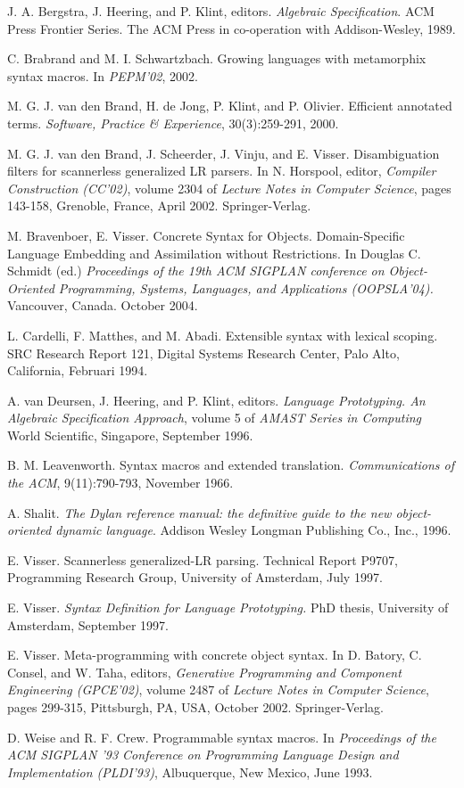 \documentclass[a4paper,11pt]{article}
\begin{document}
\begin{thebibliography}{99}

J. A. Bergstra, J. Heering, and P. Klint, editors. \emph{Algebraic
Specification}. ACM Press Frontier Series. The ACM Press in co-operation with Addison-Wesley,
1989.

C. Brabrand and M. I. Schwartzbach. Growing languages with metamorphix
syntax macros. In \emph{PEPM'02}, 2002.

M. G. J. van den Brand, H. de Jong, P. Klint, and P. Olivier. Efficient
annotated terms. \emph{Software, Practice \& Experience}, 30(3):259-291, 2000.

M. G. J. van den Brand, J. Scheerder, J. Vinju, and E. Visser.
Disambiguation filters for scannerless generalized LR parsers. In N. Horspool, editor,
\emph{Compiler Construction (CC'02)}, volume 2304 of \emph{Lecture Notes in Computer
Science}, pages 143-158, Grenoble, France, April 2002. Springer-Verlag.

M. Bravenboer, E. Visser. Concrete Syntax for Objects.
Domain-Specific Language Embedding and Assimilation without Restrictions. In Douglas
C. Schmidt (ed.) \emph{Proceedings of the 19th ACM SIGPLAN conference on
Object-Oriented Programming, Systems, Languages, and Applications (OOPSLA'04).}
Vancouver, Canada. October 2004.

L. Cardelli, F. Matthes, and M. Abadi. Extensible syntax with lexical
scoping. SRC Research Report 121, Digital Systems Research Center, Palo Alto,
California, Februari 1994.

A. van Deursen, J. Heering, and P. Klint, editors. \emph{Language Prototyping.
An Algebraic Specification Approach}, volume 5 of \emph{AMAST Series in Computing} World
Scientific, Singapore, September 1996.

B. M. Leavenworth. Syntax macros and extended translation. \emph{Communications
of the ACM}, 9(11):790-793, November 1966.

A. Shalit. \emph{The Dylan reference manual: the definitive guide
to the new object-oriented dynamic language}. Addison Wesley Longman Publishing
Co., Inc., 1996.

E. Visser. Scannerless generalized-LR parsing.
Technical Report P9707, Programming Research Group, University of Amsterdam, July 1997.

E. Visser. \emph{Syntax Definition for Language Prototyping.} PhD
thesis, University of Amsterdam, September 1997.

E. Visser. Meta-programming with concrete object syntax. In D. Batory,
C. Consel, and W. Taha, editors, \emph{Generative Programming and Component Engineering
(GPCE'02)}, volume 2487 of \emph{Lecture Notes in Computer Science}, pages 299-315, Pittsburgh,
PA, USA, October 2002. Springer-Verlag.

D. Weise and R. F. Crew. Programmable syntax macros. In \emph{Proceedings
of the ACM SIGPLAN '93 Conference on Programming Language Design and Implementation
(PLDI'93)}, Albuquerque, New Mexico, June 1993.

\end{thebibliography}
\end{document}
